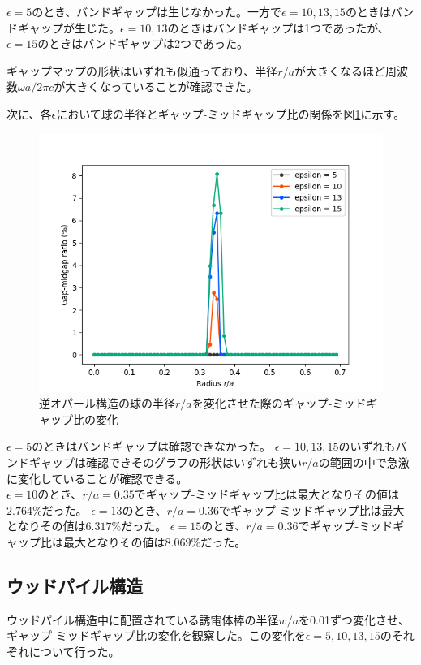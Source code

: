 \documentclass[platex,dvipdfmx]{jsreport}
\numberwithin{equation}{section}
\begin{document}
$\epsilon = 5$のとき、バンドギャップは生じなかった。一方で$\epsilon = 10, 13, 15$のときはバンドギャップが生じた。$\epsilon = 10, 13$のときはバンドギャップは1つであったが、$\epsilon = 15$のときはバンドギャップは2つであった。

ギャップマップの形状はいずれも似通っており、半径$r / a$が大きくなるほど周波数$\omega a / 2 \pi c$が大きくなっていることが確認できた。

次に、各$\epsilon$において球の半径とギャップ-ミッドギャップ比の関係を図\ref{fig:inv_opal}に示す。

  
\begin{figure}[htbp]
  \centering
  \includegraphics[width=0.8\linewidth]{results/gap_midgap_ratio/inv_opals.png}
  \caption{逆オパール構造の球の半径$r / a$を変化させた際のギャップ-ミッドギャップ比の変化}
  \label{fig:inv_opal}
\end{figure}

$\epsilon = 5$のときはバンドギャップは確認できなかった。
$\epsilon = 10, 13, 15$のいずれもバンドギャップは確認できそのグラフの形状はいずれも狭い$r / a$の範囲の中で急激に変化していることが確認できる。
\\
$\epsilon = 10$のとき、$r / a = 0.35$でギャップ-ミッドギャップ比は最大となりその値は$2.764 \%$だった。
$\epsilon = 13$のとき、$r / a = 0.36$でギャップ-ミッドギャップ比は最大となりその値は$6.317 \%$だった。
$\epsilon = 15$のとき、$r / a = 0.36$でギャップ-ミッドギャップ比は最大となりその値は$8.069 \%$だった。

\clearpage

\subsection{ウッドパイル構造}
ウッドパイル構造中に配置されている誘電体棒の半径$w / a$を0.01ずつ変化させ、ギャップ-ミッドギャップ比の変化を観察した。この変化を$\epsilon = 5, 10, 13, 15$のそれぞれについて行った。
\end{document}
